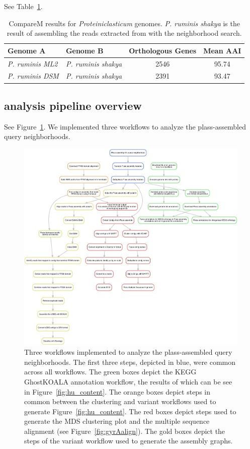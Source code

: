 See Table~\ref{tab:aai}.

\begin{table}
  \begin{tabular}{l l c c }
    \toprule
    Genome A & Genome B & Orthologous Genes & Mean AAI \\
    \midrule
    {\em P. ruminis ML2} & {\em P. ruminis shakya} & 2546 & 95.74 \\
    {\em P. ruminis DSM} & {\em P. ruminis shakya}  & 2391 & 93.47 \\
    \hline
    \bottomrule
  \end{tabular}
  \caption{CompareM results for {\em Proteiniclasticum} genomes. {\em P. ruminis shakya} is the result of assembling the reads extracted from \podarv with the neighborhood search.}
  \label{tab:aai}
\end{table}


\subsection{\hu analysis pipeline overview}


See Figure~\ref{fig:hu_dag}. We implemented three workflows to analyze the
plass-assembled \hu query neighborhoods. 


\begin{figure}
 \centering
 \includegraphics[width=\linewidth]{figures/hu_dag}
	\caption{Three workflows implemented to analyze the plass-assembled
\hu query neighborhoods. The first three steps, depicted in blue, were common
across all workflows. The green boxes depict the KEGG GhostKOALA annotation
workflow, the results of which can be see in Figure~\ref{fig:hu_content}. 
The orange boxes depict steps in common between the clustering and variant
workflows used to generate Figure~\ref{fig:hu_content}. The red boxes depict
steps used to generate the MDS clustering plot and the multiple sequence 
alignment (see Figure~\ref{fig:gyrAalign}). The gold boxes depict the
steps of the variant workflow used to generate the assembly graphs.  
}
 \label{fig:hu_dag}
\end{figure}

